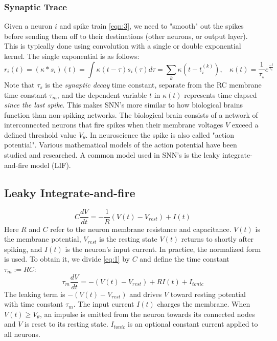 \documentclass[11pt]{article}
\theoremstyle{definition}
\theoremstyle{remark}
\begin{document}
    \subsubsection{Synaptic Trace}
    Given a neuron $i$ and spike train \ref{eqn:3}, we need to "smooth" out the spikes before sending them off to their destinations (other neurons, or output layer). This is typically done using convolution with a single or double exponential kernel. The single exponential is as follows:
    \begin{equation}\label{eqn:conv1}
        r_i(t) = \left(\kappa\ast s_i\right)(t) = \int\kappa(t-\tau)s_i(\tau)d\tau = \sum_{k}\kappa\left(t-t_i^{(k)}\right), \ \ \ \ \kappa(t) = \frac{1}{\tau_s}e^{\frac{-t}{\tau_s}}
    \end{equation}
    Note that $\tau_s$ is the \textit{synaptic decay} time constant, separate from the RC membrane time constant $\tau_m$, and the dependent variable $t$ in $\kappa(t)$ represents time elapsed \textit{since the last spike}.
     This makes SNN's more similar to how biological brains function than non-spiking networks. The biological brain consists of a network of interconnected neurons that fire spikes when their membrane voltages $V$ exceed a defined threshold value $V_{\theta}$. In neuroscience the spike is also called "action potential". Various mathematical models of the action potential have been studied and researched. A common model used in SNN's is the leaky integrate-and-fire model (LIF).
     \subsection{Leaky Integrate-and-fire}
     \begin{equation} \label{eq:1}
         C\frac{dV}{dt} = -\frac{1}{R}\left(V(t) - V_{rest}\right) + I(t)
     \end{equation}
     Here $R$ and $C$ refer to the neuron membrane resistance and capacitance. $V(t)$ is the membrane potential, $V_{rest}$ is the resting state $V(t)$ returns to shortly after spiking, and $I(t)$ is the neuron's input current.
     In practice, the normalized form is used. To obtain it, we divide \ref{eq:1} by $C$ and define the time constant $\tau_m := RC$:
     \begin{equation}\label{eq:2}
         \tau_m\frac{dV}{dt} = -\left( V(t) - V_{rest} \right) + RI(t) + I_{tonic}
     \end{equation}
    The leaking term is $-(V(t) - V_{rest})$ and drives $V$ toward resting potential with time constant $\tau_m$.
    The input current $I(t)$ charges the membrane. When $V(t) \geq V_{\theta}$, an impulse is emitted from the neuron towards its connected nodes and $V$ is reset to its resting state. $I_{tonic}$ is an optional constant current applied to all neurons.
\end{document}
